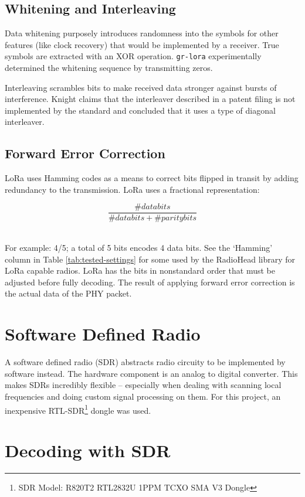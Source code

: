 \documentclass[conference, compsoc]{IEEEtran}
\begin{document}
\subsection{Whitening and Interleaving}
Data whitening purposely introduces randomness into the symbols for other features (like clock recovery) that would be implemented by a receiver. True symbols are extracted with an XOR operation. \texttt{gr-lora} experimentally determined the whitening sequence by transmitting zeros.

Interleaving scrambles bits to make received data stronger against bursts of interference. Knight claims that the interleaver described in a patent filing is not implemented by the standard and concluded that it uses a type of diagonal interleaver\cite{grcon}.

\subsection{Forward Error Correction}
LoRa uses Hamming codes as a means to correct bits flipped in transit by adding redundancy to the transmission. LoRa uses a fractional representation: 

\begin{equation}
\frac{\# data bits}{\# data bits + \# parity bits}
\end{equation}
\ %

For example: 4/5; a total of 5 bits encodes 4 data bits. See the `Hamming' column in Table \ref{tab:tested-settings} for some used by the RadioHead library for LoRa capable radios. LoRa has the bits in nonstandard order that must be adjusted before fully decoding. The result of applying forward error correction is the actual data of the PHY packet.

\section{Software Defined Radio}
A software defined radio (SDR) abstracts radio circuity to be implemented by software instead. The hardware component is an analog to digital converter. This makes SDRs incredibly flexible -- especially when dealing with scanning local frequencies and doing custom signal processing on them. For this project, an inexpensive RTL-SDR\footnote{SDR Model: R820T2 RTL2832U 1PPM TCXO SMA V3 Dongle} dongle was used.

\section{Decoding with SDR}
\end{document}
